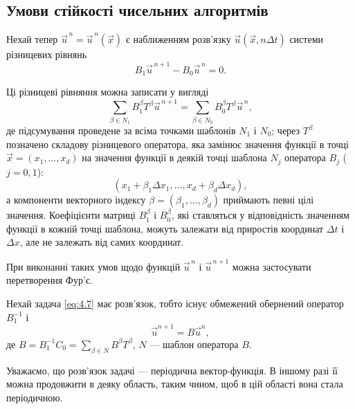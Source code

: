 \subsection{Умови стійкості чисельних алгоритмів}

Нехай тепер $\vec u^{\,n} = \vec u^{\,n}(\vec x)$ є наближенням розв'язку $\vec u(\vec x, n \Delta t)$ системи різницевих рівнянь 
\begin{equation*}
    B_1 \vec u^{\,n + 1} - B_0 \vec u^{\,n} = 0.
\end{equation*}

Ці різницеві рівняння можна записати у вигляді 
\begin{equation}
    \label{eq:4.7}
    \sum_{\beta \in N_1} B_1^\beta T^\beta \vec u^{\,n + 1} = \sum_{\beta \in N_0} B_0^\beta T^\beta \vec u^{\,n},
\end{equation}
де підсумування проведене за всіма точками шаблонів $N_1$ і $N_0$; через $T^\beta$ позначено складову різницевого оператора, яка замінює значення функції в точці $\vec x = (x_1, \ldots, x_d)$ на значення функції в деякій точці шаблона $N_j$ оператора $B_j$ ($j = 0, 1$):
\begin{equation*}
    (x_1 + \beta_1 \Delta x_1, \ldots, x_d + \beta_d \Delta x_d),
\end{equation*}
а компоненти векторного індексу $\beta = (\beta_1, \ldots, \beta_d)$ приймають певні цілі значення. Коефіцієнти матриці $B_1^\beta$ і $B_0^\beta$, які ставляться у відповідність значенням функції в кожній точці шаблона, можуть залежати від приростів координат $\Delta t$ і $\Delta x$, але не залежать від самих координат.

\begin{proposition}
    При виконанні таких умов щодо функцій $\vec u^{\,n}$ і $\vec u^{\,n + 1}$ можна застосувати перетворення Фур'є.
\end{proposition}

Нехай задача \eqref{eq:4.7} має розв'язок, тобто існує обмежений обернений оператор $B_1^{-1}$ і
\begin{equation}
    \label{eq:4.8}
    \vec u^{n + 1} = B \vec u^n, 
\end{equation}
де $B = B_1^{-1} C_0 = \sum_{\beta \in N} B^\beta T^\beta$, $N$ --- шаблон оператора $B$. 

\begin{remark}
    Уважаємо, що розв'язок задачі --- періодична вектор-функція. В іншому разі її можна продовжити в деяку область, таким чином, щоб в цій області вона стала періодичною.
\end{remark}

